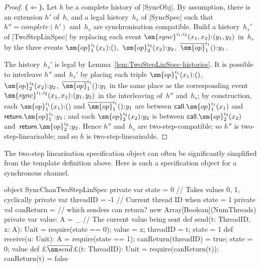 \begin{proof}

\textbf{($\Leftarrow$).}\quad
%
Let $h$ be a complete history of |SyncObj|.  By assumption, there is an
extension $h'$ of~$h$, and a legal history~$h_s$ of |SyncSpec| such that $h''
= complete(h')$ and~$h_s$ are synchronisation compatible.
%
Build a history~$h_s'$ of |TwoStepLinSpec| by replacing each event
$\sm{sync}^{i_1,i_2}(x_1,x_2) \:: (y_1,y_2)$ in~$h_s$ by the three events
$\sm{op}_1^{i_1}(x_1) \:: ()$,\, $\sm{op}_2^{i_2}(x_2) \:: y_2$,\,
$\overline{\sm{op}}_1^{i_1}() \:: y_1$.

The history~$h_s'$ is legal by Lemma~\ref{lem:TwoStepLinSpec-histories}.
%
It is possible to interleave $h''$ and~$h_s'$ by placing each triple
$\sm{op}_1^{i_1}(x_1) \:: ()$,\, $\sm{op}_2^{i_2}(x_2) \:: y_2$,\,
$\overline{\sm{op}}_1^{i_1}() \:: y_1$ in the same place as the corresponding
event $\sm{sync}^{i_1,i_2}(x_1,x_2) \:: (y_1,y_2)$ in the interleaving
of~$h''$ and~$h_s$; by construction, each $\sm{op}_1^{i_1}(x_1) \:: ()$ and
$\overline{\sm{op}}_1^{i_1}() \:: y_1$ are between
$\call.\sm{op}_1^{i_1}(x_1)$ and~$\return.\sm{op}_1^{i_1} \:: y_1$; and each
$\sm{op}_2^{i_2}(x_2) \:: y_2$ is between $\call.\sm{op}_2^{i_2}(x_2)$
and~$\return.\sm{op}_2^{i_2} \:: y_2$.
%
Hence $h''$ and~$h_s$ are two-step-compatible; so $h''$ is
two-step-linearisable; and so $h$ is two-step-linearisable.
\end{proof}

The two-step linearisation specification object can often be significantly
simplified from the template definition above.  Here is such a specification
object for a synchronous channel.
%
\begin{scala}
object SyncChanTwoStepLinSpec{
  private var state = 0           // Takes values 0, 1, cyclically 
  private var threadID = -1    // Current thread ID when state = 1
  private val canReturn =       // which senders can return?
    new Array[Boolean](NumThreads) 
  private var value: A = _      // The current value being sent
  def send(t: ThreadID, x: A): Unit = { 
    require(state == 0); value = x; threadID = t; state = 1 }
  def receive(u: Unit): A = { 
    require(state == 1); canReturn(threadID) = true; state = 0; value }
  def £$\overline{\send}$£(t: ThreadID): Unit = { require(canReturn(t)); canReturn(t) = false }
}
\end{scala}



